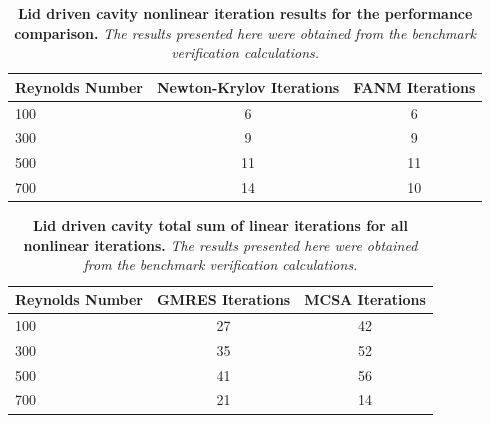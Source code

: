 \begin{table}[h!]
  \begin{center}
    \begin{tabular}{lcc}\hline\hline
      \multicolumn{1}{l}{Reynolds Number}& 
      \multicolumn{1}{c}{Newton-Krylov Iterations}&
      \multicolumn{1}{c}{FANM Iterations}\\
      \hline
      100 & 6 & 6 \\
      300 & 9 & 9 \\
      500 & 11 & 11 \\
      700 & 14 & 10 \\
      \hline\hline
    \end{tabular}
  \end{center}
  \caption{\textbf{Lid driven cavity nonlinear iteration
      results for the performance comparison.} \textit{The results
      presented here were obtained from the benchmark verification
      calculations.}}
  \label{tab:driven_nonlinear_iter_comparison}
\end{table}

\begin{table}[h!]
  \begin{center}
    \begin{tabular}{lcc}\hline\hline
      \multicolumn{1}{l}{Reynolds Number}& 
      \multicolumn{1}{c}{GMRES Iterations}&
      \multicolumn{1}{c}{MCSA Iterations}\\
      \hline
      100 & 27 & 42 \\
      300 & 35 & 52 \\
      500 & 41 & 56 \\
      700 & 21 & 14 \\
      \hline\hline
    \end{tabular}
  \end{center}
  \caption{\textbf{Lid driven cavity total sum of linear
      iterations for all nonlinear iterations.} \textit{The results
      presented here were obtained from the benchmark verification
      calculations.}}
  \label{tab:driven_linear_iter_comparison}
\end{table}

